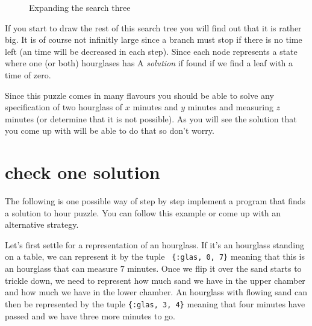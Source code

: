 \documentclass[a4paper,11pt]{article}
\begin{document}
\begin{figure}[h]
\center
{}
\caption{Expanding the search three}
\end{figure}

If you start to draw the rest of this search tree you will find out
that it is rather big. It is of course not infinitly large since a
branch must stop if there is no time left (an time will be decreased
in each step). Since each node represents a state where one (or both)
hourglases has A {\em solution} if found if we find a leaf with a time
of zero.

Since this puzzle comes in many flavours you should be able to solve
any specification of two hourglass of $x$ minutes and $y$ minutes and
measuring $z$ minutes (or determine that it is not possible). As you
will see the solution that you come up with will be able to do that so
don't worry.

\section*{check one solution}

The following is one possible way of step by step implement a program
that finds a solution to hour puzzle. You can follow this example or
come up with an alternative strategy.

Let's first settle for a representation of an hourglass. If it's an
hourglass standing on a table, we can represent it by the tuple {\tt
  \{:glas, 0, 7\}} meaning that this is an hourglass that can measure $7$
minutes. Once we flip it over the sand starts to trickle down, we need
to represent how much sand we have in the upper chamber and how much
we have in the lower chamber. An hourglass with flowing sand can then
be represented by the tuple {\tt \{:glas, 3, 4\}} meaning that four
minutes have passed and we have three more minutes to go.
\end{document}
